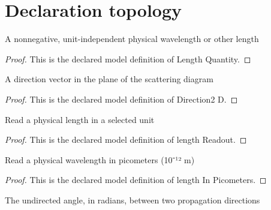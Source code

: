 \section{Declaration topology}
\begin{definition}
  \label{def:physics:phyx-mini-0530:phyxminiproblems-problemphyxmini0530-lengthquantity}
  A nonnegative, unit-independent physical wavelength or other length
\end{definition}
\begin{proof}
  This is the declared model definition of Length Quantity.
\end{proof}
\begin{definition}[Direction2 D]
  \label{def:physics:phyx-mini-0530:phyxminiproblems-problemphyxmini0530-direction2d}
  A direction vector in the plane of the scattering diagram
\end{definition}
\begin{proof}
  This is the declared model definition of Direction2 D.
\end{proof}
\begin{definition}
  \label{def:physics:phyx-mini-0530:phyxminiproblems-problemphyxmini0530-lengthreadout}
  Read a physical length in a selected unit
\end{definition}
\begin{proof}
  This is the declared model definition of length Readout.
\end{proof}
\begin{definition}
  \label{def:physics:phyx-mini-0530:phyxminiproblems-problemphyxmini0530-lengthinpicometers}
  Read a physical wavelength in picometers (10⁻¹² m)
\end{definition}
\begin{proof}
  This is the declared model definition of length In Picometers.
\end{proof}
\begin{definition}
  \label{def:physics:phyx-mini-0530:phyxminiproblems-problemphyxmini0530-directionangle}
  The undirected angle, in radians, between two propagation directions
\end{definition}
